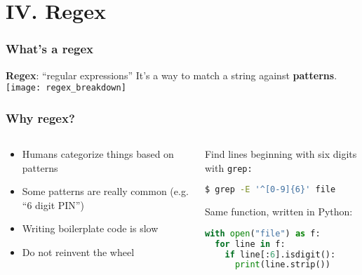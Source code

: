 \section{IV. Regex}
\begin{frame}
\frametitle{What's a regex}
\textbf{Regex}: ``regular expressions''
\newline \newline
It's a way to match a string against \textbf{patterns}.
\newline \newline
\texttt{[image: regex\_breakdown]}
\end{frame}

\begin{frame}[fragile]
\frametitle{Why regex?}
\begin{columns}
    \begin{column}{0.5\textwidth}
        \begin{itemize}
            \item Humans categorize things based on patterns
            \item Some patterns are really common (e.g. ``6 digit PIN'')
            \item Writing boilerplate code is slow
            \item Do not reinvent the wheel
        \end{itemize}
    \end{column}
    \begin{column}{0.5\textwidth}
        \begin{example}
            Find lines beginning with six digits with \tt{grep}:
\begin{lstlisting}[language=bash]
$ grep -E '^[0-9]{6}' file
\end{lstlisting}
            Same function, written in Python:
\begin{lstlisting}[language=python]
with open("file") as f:
  for line in f:
    if line[:6].isdigit():
      print(line.strip())
\end{lstlisting}
        \end{example}
    \end{column}
\end{columns}
\end{frame}

